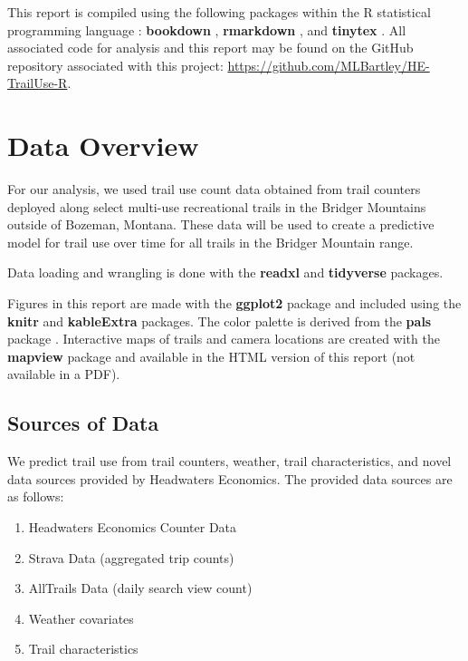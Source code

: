 \documentclass[
]{book}
\providecommand{\tightlist}{%
  \setlength{\itemsep}{0pt}\setlength{\parskip}{0pt}}
\begin{document}
This report is compiled using the following packages within the R statistical programming language \citep{R-base}: \textbf{bookdown} \citep{R-bookdown}, \textbf{rmarkdown} \citep{R-rmarkdown}, and \textbf{tinytex} \citep{R-tinytex}. All associated code for analysis and this report may be found on the GitHub repository associated with this project: \url{https://github.com/MLBartley/HE-TrailUse-R}.

\hypertarget{Data}{%
\chapter{Data Overview}\label{Data}}

For our analysis, we used trail use count data obtained from trail
counters deployed along select multi-use recreational trails in the
Bridger Mountains outside of Bozeman, Montana. These data will be used
to create a predictive model for trail use over time for all trails in
the Bridger Mountain range.

Data loading and wrangling is done with the \textbf{readxl} \citep{R-readxl} and
\textbf{tidyverse} \citep{R-tidyverse} packages.

Figures in this report are made with the \textbf{ggplot2} package
\citep{R-ggplot2} and included using the \textbf{knitr} \citep{R-knitr} and
\textbf{kableExtra} \citep{R-kableExtra} packages. The color palette is derived
from the \textbf{pals} package \citep{R-pals}. Interactive maps of trails and
camera locations are created with the \textbf{mapview} package \citep{R-mapview}
and available in the HTML version of this report (not available in a
PDF).

\hypertarget{sources-of-data}{%
\section{Sources of Data}\label{sources-of-data}}

We predict trail use from trail counters, weather, trail
characteristics, and novel data sources provided by Headwaters
Economics. The provided data sources are as follows:

\begin{enumerate}
\def\labelenumi{\arabic{enumi}.}
\tightlist
\item
  Headwaters Economics Counter Data
\item
  Strava Data (aggregated trip counts)
\item
  AllTrails Data (daily search view count)
\item
  Weather covariates
\item
  Trail characteristics
\end{enumerate}
\end{document}
